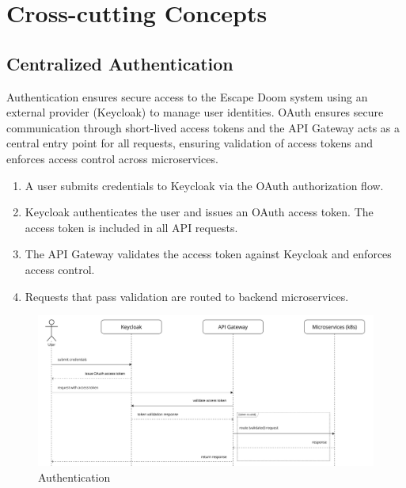 \hypertarget{section-concepts}{%
\section{Cross-cutting Concepts}\label{section-concepts}}

\subsection{Centralized Authentication}

Authentication ensures secure access to the Escape Doom system using an external provider (Keycloak) to manage user identities. OAuth ensures secure communication through short-lived access tokens and the API Gateway acts as a central entry point for all requests, ensuring validation of access tokens and enforces access control across microservices.

\begin{enumerate}
    \item A user submits credentials to Keycloak via the OAuth authorization flow.
    \item Keycloak authenticates the user and issues an OAuth access token. The access token is included in all API requests.
    \item The API Gateway validates the access token against Keycloak and enforces access control.
    \item Requests that pass validation are routed to backend microservices.
\end{enumerate}

\begin{figure}[h!]
    \centering
    \includegraphics[width=1\textwidth]{Authentication.jpg}
    \caption{Authentication}
    \label{fig:auth-diagram}
\end{figure}

